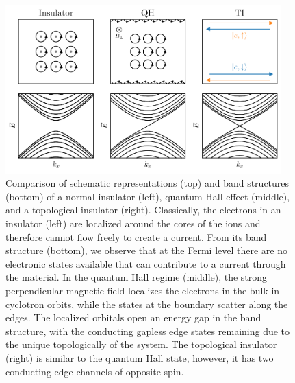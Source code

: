 \begin{figure}[!htb]
\begin{center}
\includegraphics[width=0.95\textwidth]{chapter_introduction/figures/compare-insulators.pdf}
\caption{
Comparison of schematic representations (top) and band structures (bottom) of a normal insulator (left), quantum Hall effect (middle), and a topological insulator (right).
Classically, the electrons in an insulator (left) are localized around the cores of the ions and therefore cannot flow freely to create a current.
From its band structure (bottom), we observe that at the Fermi level there are no electronic states available that can contribute to a current through the material.
In the quantum Hall regime (middle), the strong perpendicular magnetic field localizes the electrons in the bulk in cyclotron orbits, while the states at the boundary scatter along the edges.
The localized orbitals open an energy gap in the band structure, with the conducting gapless edge states remaining due to the unique topologically of the system.
The topological insulator (right) is similar to the quantum Hall state, however, it has two conducting edge channels of opposite spin.
\label{fig:compare_insulators}}
\end{center}
\end{figure}

